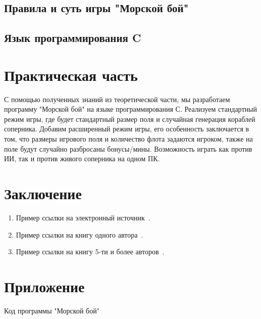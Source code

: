 \documentclass[14pt, oneside]{altsu-report}
\begin{document}
\section{Правила и суть игры "Морской бой"}
\section{Язык программирования C}


\chapter{Практическая часть}
С помощью полученных знаний из теоретической части, мы разработаем программу "Морской бой" на языке программирования С. Реализуем стандартный режим игры, где будет стандартный размер поля и случайная генерация кораблей соперника. Добавим расширенный режим игры, его особенность заключается в том, что размеры игрового поля и количество флота задаются игроком, также на поле будут случайно разбросаны бонусы/мины. Возможность играть как против ИИ, так и против живого соперника на одном ПК.


\chapter*{Заключение}

\begin{enumerate}
\item Пример ссылки на электронный источник~\cite{}.
\item Пример ссылки на книгу одного автора~\cite{book1author}.
\item Пример ссылки на книгу 5-ти и более авторов~\cite{book5author}.
\end{enumerate}

\newpage
{}
\printbibliography[title={Список использованной литературы}]

\appendix
\newpage
\chapter*{\raggedleft\label{appendix1}Приложение}

\begin{center}
\label{code:appendix}Код программы "Морской бой"
\end{center}

\begin{verbatim}

\end{verbatim}
\end{document}
